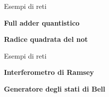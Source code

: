 \documentclass[aspectratio=169]{beamer}
\begin{document}
%
\begin{frame}{Esempi di reti}
	\begin{minipage}{0.6\textwidth}
		\centering
		\textbf{Full adder quantistico}
	\end{minipage}
	\pause
	\vspace{-20pt}
	\begin{flushright}
		\begin{minipage}{0.6\textwidth}
			\centering
			\textbf{Radice quadrata del not}\\
		\end{minipage}
	\end{flushright}
\end{frame}
\begin{frame}{Esempi di reti}
	\begin{minipage}{0.48\textwidth}
		\centering
		\textbf{Interferometro di Ramsey}
		\scalebox{2}{
			\begin{quantikz}
				\qw & \gate{H} & \gate{P}	& \gate{H} & \qw
			\end{quantikz}
		}
	\end{minipage}
	\pause
	\begin{flushright}
		\begin{minipage}{0.5\textwidth}
			\centering
			\textbf{Generatore degli stati di Bell}
			\scalebox{2}{
				\begin{quantikz}
					\qw & \gate{H} & \ctrl{1}	& \qw \\
					\qw &    \qw   & \targ{} &  \qw
				\end{quantikz}
			}
		\end{minipage}
	\end{flushright}


\end{frame}
\end{document}
